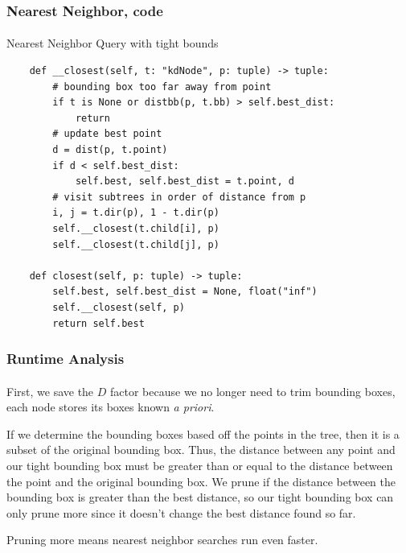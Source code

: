 \documentclass{beamer}                             %
\begin{document}
\begin{frame}[fragile]
\frametitle{Nearest Neighbor, code}
\framesubtitle{}
\begin{algorithm}[H]
  \caption{Nearest Neighbor Query with tight bounds}
  \begin{verbatim}
    def __closest(self, t: "kdNode", p: tuple) -> tuple:
        # bounding box too far away from point 
        if t is None or distbb(p, t.bb) > self.best_dist:
            return
        # update best point
        d = dist(p, t.point)
        if d < self.best_dist:
            self.best, self.best_dist = t.point, d
        # visit subtrees in order of distance from p
        i, j = t.dir(p), 1 - t.dir(p)
        self.__closest(t.child[i], p)
        self.__closest(t.child[j], p)

    def closest(self, p: tuple) -> tuple:
        self.best, self.best_dist = None, float("inf")
        self.__closest(self, p)
        return self.best
  \end{verbatim}
\end{algorithm}
\end{frame}

\begin{frame}
\frametitle{Runtime Analysis}
\framesubtitle{}
First, we save the \( D \) factor because we no longer need to trim bounding
boxes, each node stores its boxes known \textit{a priori}. \pause

If we determine the bounding boxes based off the points in the tree,
then it is a subset of the original bounding box.
Thus, the distance between any point and our tight bounding box must be
greater than or equal to the distance between the point and the original
bounding box. We prune if the distance between the bounding box is greater
than the best distance, so our tight bounding box can only prune more
since it doesn't change the best distance found so far.

Pruning more means nearest neighbor searches run even faster.
\end{frame}
\end{document}
